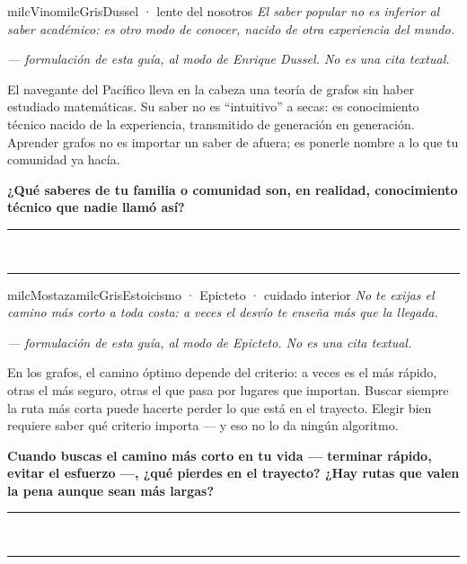 \documentclass[11pt,letterpaper]{article}
\newcommand{\linead}[1]{\noindent\color{milcLinea}\rule{#1}{0.5pt}\color{milcNegro}}
\begin{document}
\begin{softbox}{milcVino}{milcGris}{Dussel · lente del nosotros}
\textit{El saber popular no es inferior al saber académico: es otro modo de conocer, nacido de otra experiencia del mundo.}

{\footnotesize\itshape\color{milcNegro!70}--- formulación de esta guía, al modo de Enrique Dussel. No es una cita textual.}

El navegante del Pacífico lleva en la cabeza una teoría de grafos sin haber estudiado matemáticas. Su saber no es ``intuitivo'' a secas: es conocimiento técnico nacido de la experiencia, transmitido de generación en generación. Aprender grafos no es importar un saber de afuera; es ponerle nombre a lo que tu comunidad ya hacía.

\textbf{¿Qué saberes de tu familia o comunidad son, en realidad, conocimiento técnico que nadie llamó así?}
\end{softbox}
\linead{\linewidth}\\[1mm]
\linead{\linewidth}

\begin{softbox}{milcMostaza}{milcGris}{Estoicismo · Epicteto · cuidado interior}
\textit{No te exijas el camino más corto a toda costa: a veces el desvío te enseña más que la llegada.}

{\footnotesize\itshape\color{milcNegro!70}--- formulación de esta guía, al modo de Epicteto. No es una cita textual.}

En los grafos, el camino óptimo depende del criterio: a veces es el más rápido, otras el más seguro, otras el que pasa por lugares que importan. Buscar siempre la ruta más corta puede hacerte perder lo que está en el trayecto. Elegir bien requiere saber qué criterio importa --- y eso no lo da ningún algoritmo.

\textbf{Cuando buscas el camino más corto en tu vida --- terminar rápido, evitar el esfuerzo ---, ¿qué pierdes en el trayecto? ¿Hay rutas que valen la pena aunque sean más largas?}
\end{softbox}
\linead{\linewidth}\\[1mm]
\linead{\linewidth}
\end{document}
